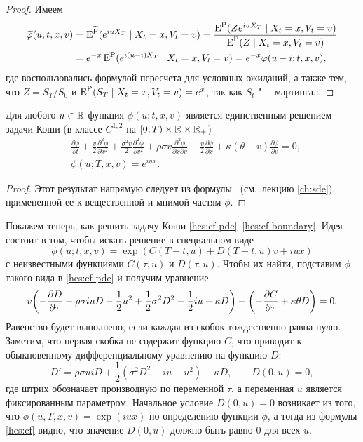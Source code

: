 \begin{proof}
Имеем
\[
\begin{split}
\widetilde{\varphi}(u; t,x,v) &= \operatorname{E}^{\widetilde{\mathrm{P}}} (e^{iu X_T}  \mid X_t=x, V_t = v)
= \frac{\operatorname{E}^{\mathrm{P}} (Z e^{iu X_T} \mid X_t=x, V_t = v)}{\operatorname{E}^{\mathrm{P}}(Z \mid X_t=x,V_t=v)} \\
&= e^{-x} \operatorname{E}^{\mathrm{P}} (e^{i(u-i)X_T} \mid X_t=x, V_t = v)
= e^{-x}\varphi(u-i; t,x,v),
\end{split}
\]
где воспользовались формулой пересчета для условных ожиданий, а также тем, что $Z=S_T/S_0$ и $\operatorname{E}^{\mathrm{P}}(S_T  \mid X_t=x, V_t = v) = e^x$, так как $S_t$ "--- мартингал.
\end{proof}

\begin{lemma}
Для любого $u\in \mathbb{R}$ функция $\phi(u;t,x,v)$ является единственным решением задачи Коши (в классе $C^{1,2}$ на $[0,T)\times\mathbb{R}\times\mathbb{R}_+$)
\begin{align}
\label{hes:cf-pde}
&\frac{\partial\phi}{\partial t} + \frac v2 \frac{\partial^2 \phi}{\partial x^2}  +\frac{\sigma^2v}{2} \frac{\partial^2\phi}{\partial v^2}
  + \rho\sigma v \frac{\partial^2\phi}{\partial x\partial v} -\frac v2 \frac{\partial \phi}{\partial x} 
  + \kappa(\theta-  v)\frac{\partial\phi}{\partial v} = 0,\\
\label{hes:cf-boundary}
&\phi(u;T,x,v) = e^{iu x}.
\end{align}
\end{lemma}

\begin{proof}
Этот результат напрямую следует из формулы \fc\ (см.~лекцию \ref{ch:sde}), примененной ее к вещественной и мнимой частям $\phi$.
\end{proof}

Покажем теперь, как решить задачу Коши \eqref{hes:cf-pde}--\eqref{hes:cf-boundary}.
Идея состоит в том, чтобы искать решение в специальном виде
\begin{equation}
\label{hes:cf}
\phi(u; t,x,v) = \exp(C(T-t,u) + D(T-t,u)v + iu x)
\end{equation}
с неизвестными функциями $C(\tau,u)$ и $D(\tau,u)$.
Чтобы их найти, подставим $\phi$ такого вида в \eqref{hes:cf-pde} и получим уравнение
\begin{equation}
\label{hes:CD-equation}
v\biggl(
  -\frac{\partial D}{\partial \tau} + \rho\sigma iu D - \frac12 u^2 
  + \frac12 \sigma^2 D^2 -\frac12 iu-\kappa D
\biggr) + \biggl(-\frac{\partial C}{\partial \tau} + \kappa\theta D\biggr) = 0.
\end{equation}
Равенство будет выполнено, если каждая из скобок тождественно равна нулю.
Заметим, что первая скобка не содержит функцию $C$, что приводит к обыкновенному дифференциальному уравнению на функцию $D$:
\[
D' = \rho\sigma ui D + \frac12 (\sigma^2 D^2 - iu - u^2) - \kappa D, \qquad D(0,u)=0,
\]
где штрих обозначает производную по переменной $\tau$, а переменная $u$ является фиксированным параметром.
Начальное условие $D(0,u)=0$ возникает из того, что $\phi(u,T,x,v) = \exp(iux)$ по определению функции $\phi$, а тогда из формулы \eqref{hes:cf} видно, что значение $D(0,u)$ должно быть равно 0 для всех $u$.

